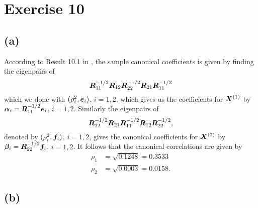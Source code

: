 \section*{Exercise 10}
\label{sec:exercise-10}

\subsection*{(a)}
\label{sec:a-6}

According to Result 10.1 in \cite[p. 541]{book}, the sample canonical coefficients is given by finding the eigenpairs of
\begin{equation*}
  \bm{R}_{11}^{-1/2} \bm{R}_{12} \bm{R}_{22}^{-1/2} \bm{R}_{21} \bm{R}_{11}^{-1/2}
\end{equation*}
which we done with $(\rho^{2}_{i}, \bm{e}_{i})$, $i =1,2$, which gives us the
coefficients for $\bm{X}^{(1)}$ by $\bm{\alpha}_{i} = \bm{R}_{11}^{-1/2} \bm{e}_{i}$, $i =1,2$. Similarly the eigenpairs of
\begin{equation*}
  \bm{R}_{22}^{-1/2} \bm{R}_{21} \bm{R}_{11}^{-1/2} \bm{R}_{12} \bm{R}_{22}^{-1/2},
\end{equation*}
denoted by $(\rho^{2}_{i}, \bm{f}_{i})$, $i =1,2$, gives the canonical coefficients for $\bm{X}^{(2)}$  by $\bm{\beta}_{i} = \bm{R}_{22}^{-1/2} \bm{f}_{i}$, $i= 1,2$. It
follows that the canonical correlations are given by
\begin{align*}
  \rho_{1} &=  \sqrt{0.1248} =  0.3533\\
  \rho_{2} &=  \sqrt{0.0003} = 0.0158.
\end{align*}

\subsection*{(b)}
\label{sec:b-9}

